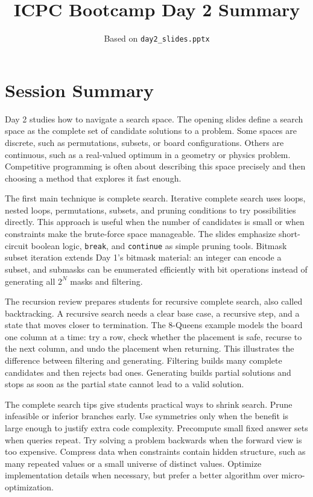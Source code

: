 \documentclass[11pt]{article}
\title{ICPC Bootcamp Day 2 Summary}
\author{Based on \texttt{day2\_slides.pptx}}
\date{}
\begin{document}
\maketitle

\section*{Session Summary}
Day 2 studies how to navigate a search space. The opening slides define a search space as the complete set of candidate solutions to a problem. Some spaces are discrete, such as permutations, subsets, or board configurations. Others are continuous, such as a real-valued optimum in a geometry or physics problem. Competitive programming is often about describing this space precisely and then choosing a method that explores it fast enough.

The first main technique is complete search. Iterative complete search uses loops, nested loops, permutations, subsets, and pruning conditions to try possibilities directly. This approach is useful when the number of candidates is small or when constraints make the brute-force space manageable. The slides emphasize short-circuit boolean logic, \texttt{break}, and \texttt{continue} as simple pruning tools. Bitmask subset iteration extends Day 1's bitmask material: an integer can encode a subset, and submasks can be enumerated efficiently with bit operations instead of generating all \(2^N\) masks and filtering.

The recursion review prepares students for recursive complete search, also called backtracking. A recursive search needs a clear base case, a recursive step, and a state that moves closer to termination. The 8-Queens example models the board one column at a time: try a row, check whether the placement is safe, recurse to the next column, and undo the placement when returning. This illustrates the difference between filtering and generating. Filtering builds many complete candidates and then rejects bad ones. Generating builds partial solutions and stops as soon as the partial state cannot lead to a valid solution.

The complete search tips give students practical ways to shrink search. Prune infeasible or inferior branches early. Use symmetries only when the benefit is large enough to justify extra code complexity. Precompute small fixed answer sets when queries repeat. Try solving a problem backwards when the forward view is too expensive. Compress data when constraints contain hidden structure, such as many repeated values or a small universe of distinct values. Optimize implementation details when necessary, but prefer a better algorithm over micro-optimization.
\end{document}
